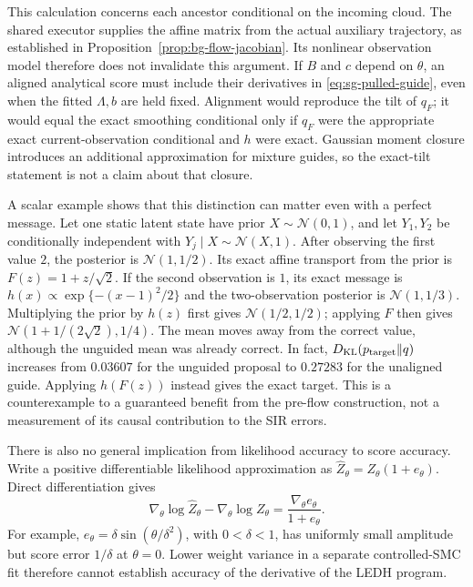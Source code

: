 This calculation concerns each ancestor conditional on the incoming cloud.
The shared executor supplies the affine matrix from the actual auxiliary
trajectory, as established in Proposition~\ref{prop:bg-flow-jacobian}.
Its nonlinear observation model therefore does not invalidate this argument.
If $B$ and $c$ depend on $\theta$, an aligned analytical score must include
their derivatives in \eqref{eq:sg-pulled-guide}, even when the fitted
$\Lambda,b$ are held fixed. Alignment would reproduce the tilt of $q_F$;
it would equal the exact smoothing conditional only if $q_F$ were the
appropriate exact current-observation conditional and $h$ were exact.
Gaussian moment closure introduces an additional approximation for mixture
guides, so the exact-tilt statement is not a claim about that closure.

A scalar example shows that this distinction can matter even with a perfect
message. Let one static latent state have prior $X\sim\mathcal N(0,1)$,
and let $Y_1,Y_2$ be conditionally independent with
$Y_j\mid X\sim\mathcal N(X,1)$.
After observing the first value $2$, the posterior is
$\mathcal N(1,1/2)$. Its exact affine transport from the prior is
$F(z)=1+z/\sqrt2$. If the second observation is $1$, its exact message is
$h(x)\propto\exp\{-(x-1)^2/2\}$ and the two-observation posterior is
$\mathcal N(1,1/3)$. Multiplying the prior by $h(z)$ first gives
$\mathcal N(1/2,1/2)$; applying $F$ then gives
$\mathcal N(1+1/(2\sqrt2),1/4)$. The mean moves away from the correct
value, although the unguided mean was already correct. In fact,
$D_{\rm KL}(p_{\rm target}\Vert q)$ increases from $0.03607$ for the
unguided proposal to $0.27283$ for the unaligned guide. Applying $h(F(z))$
instead gives the exact target. This is a counterexample to a guaranteed
benefit from the pre-flow construction, not a measurement of its causal
contribution to the SIR errors.

There is also no general implication from likelihood accuracy to score
accuracy. Write a positive differentiable likelihood approximation as
$\widehat Z_\theta=Z_\theta(1+e_\theta)$. Direct differentiation gives
\begin{equation}
 \nabla_\theta\log\widehat Z_\theta-\nabla_\theta\log Z_\theta
 =\frac{\nabla_\theta e_\theta}{1+e_\theta}.
 \label{eq:sg-value-versus-score}
\end{equation}
For example, $e_\theta=\delta\sin(\theta/\delta^2)$, with
$0<\delta<1$, has uniformly small amplitude but score error $1/\delta$
at $\theta=0$. Lower weight variance in a separate controlled-SMC fit
therefore cannot establish accuracy of the derivative of the LEDH program.

